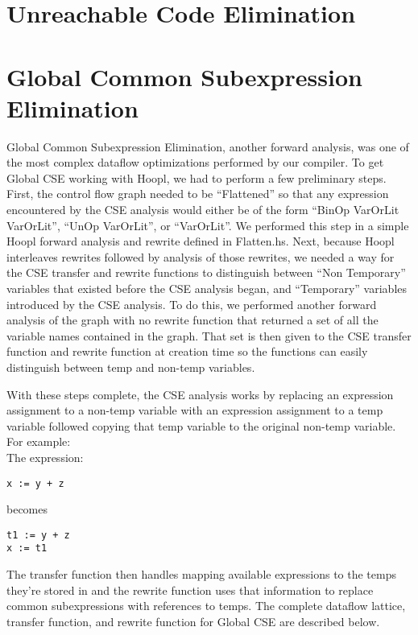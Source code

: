 \documentclass[11pt]{article}
\begin{document}
\section {Unreachable Code Elimination}
\label{sec:blockelim}

\section {Global Common Subexpression Elimination} 
\label{sec:cse}

Global Common Subexpression Elimination, another forward analysis, was one of the most complex dataflow optimizations performed by our compiler. To get Global CSE working with Hoopl, we had to perform a few preliminary steps. First, the control flow graph needed to be ``Flattened'' so that any expression encountered by the CSE analysis would either be of the form ``BinOp VarOrLit VarOrLit'', ``UnOp VarOrLit'', or ``VarOrLit''. We performed this step in a simple Hoopl forward analysis and rewrite defined in Flatten.hs. Next, because Hoopl interleaves rewrites followed by analysis of those rewrites, we needed a way for the CSE transfer and rewrite functions to distinguish between ``Non Temporary'' variables that existed before the CSE analysis began, and ``Temporary'' variables introduced by the CSE analysis. To do this, we performed another forward analysis of the graph with no rewrite function that returned a set of all the variable names contained in the graph. That set is then given to the CSE transfer function and rewrite function at creation time so the functions can easily distinguish between temp and non-temp variables. 

With these steps complete, the CSE analysis works by replacing an expression assignment to a non-temp variable with an expression assignment to a temp variable followed copying that temp variable to the original non-temp variable. For example:\\


\noindent The expression: 
\begin{verbatim}
x := y + z
\end{verbatim}

\noindent becomes 

\begin{verbatim}
t1 := y + z
x := t1
\end{verbatim}

The transfer function then handles mapping available expressions to the temps they're stored in and the rewrite function uses that information to replace common subexpressions with references to temps. The complete dataflow lattice, transfer function, and rewrite function for Global CSE are described below. 
\end{document}
